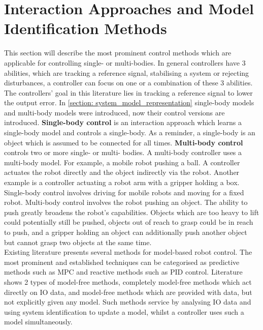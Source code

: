 
\section{Interaction Approaches and Model Identification Methods}
\label{section: interaction_approaches_and_model_iden_methods}
This section will describe the most prominent control methods which are applicable for controlling single- or multi-bodies. In general controllers have 3 abilities, which are tracking a reference signal, stabilising a system or rejecting disturbances, a controller can focus on one or a combination of these 3 abilities. The controllers' goal in this literature lies in tracking a reference signal to lower the output error. In \cref{section: system_model_representation} single-body models and multi-body models were introduced, now their control versions are introduced. \textbf{Single-body control} is an interaction approach which learns a single-body model and controls a single-body. As a reminder, a single-body is an object which is assumed to be connected for all times. \textbf{Multi-body control} controls two or more single- or multi- bodies. A multi-body controller uses a multi-body model. For example, a mobile robot pushing a ball. A controller actuates the robot directly and the object indirectly via the robot. Another example is a controller actuating a robot arm with a gripper holding a box. Single-body control involves driving for mobile robots and moving for a fixed robot. Multi-body control involves the robot pushing an object. The ability to push greatly broadens the robot's capabilities. Objects which are too heavy to lift could potentially still be pushed, objects out of reach to grasp could be in reach to push, and a gripper holding an object can additionally push another object but cannot grasp two objects at the same time.\\

Existing literature presents several methods for model-based robot control. The most prominent and established techniques can be categorised as predictive methods such as \ac{MPC} and reactive methods such as \ac{PID} control. Literature shows 2 types of model-free methods, completely model-free methods which act directly on \ac{IO} data, and model-free methods which are provided with data, but not explicitly given any model. Such   methods service by analysing \ac{IO} data and using system identification to update a model, whilst a controller uses such a model simultaneously.\\

